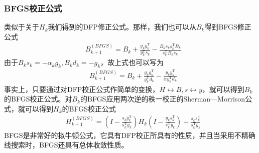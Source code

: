         \subsubsection{BFGS校正公式}
            类似于关于$H_k$我们得到的DFP修正公式。那样，我们也可以从$B_k$得到BFGS修正公式
            \begin{align*}
             & B_{k+1}^{(BFGS)}=B_k+\frac {y_ky_k^\mathrm{T} }{y_k^\mathrm{T} s_k}-\frac {B_ks_ks_k^\mathrm{T} B_k}{s_k^\mathrm{T} B_ks_k}
            \end{align*}
            由于$B_ks_k=-{\alpha}_kg_k,B_kd_k=-g_k$，故上式也可以写为
            \begin{align*}
             & B_{k+1}^{(BFGS)}=B_k+\frac {g_kg_k^\mathrm{T} }{g_k^\mathrm{T} d_k}-\frac {y_ky_k^\mathrm{T} }{{\alpha}y_k^\mathrm{T} d_k}
            \end{align*}
            事实上，只要通过对DFP校正公式作简单的变换，$H \leftrightarrow B,s \leftrightarrow y$，就可以得到$B_k$的BFGS校正公式。对$B_k$的BFGS应用两次逆的秩一校正的Sherman—Morrison公式，就可以得到$H_k$的BFGS校正公式
            \begin{align*}
             & H_{k+1}^{(BFGS)}=\left( I-\frac {s_ky_k^\mathrm{T} }{s_k^\mathrm{T} y_k} \right) H_k \left( I-\frac {y_ks_k^\mathrm{T} }{s_k^\mathrm{T} y_k} \right)  +\frac {s_ks_k^\mathrm{T} }{s_k^\mathrm{T} y_k}
            \end{align*}
            BFGS是非常好的拟牛顿公式，它具有DFP校正所具有的性质，并且当采用不精确线搜索时，BFGS还具有总体收敛性质。
